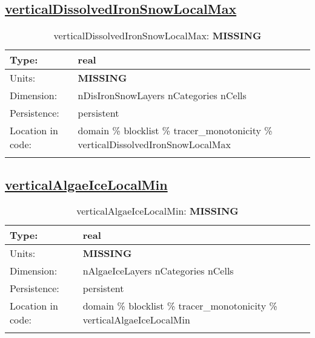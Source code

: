 \subsection[verticalDissolvedIronSnowLocalMax]{\hyperref[sec:var_tab_tracer_monotonicity]{verticalDissolvedIronSnowLocalMax}}
\label{subsec:var_sec_tracer_monotonicity_verticalDissolvedIronSnowLocalMax}
\begin{center}
\begin{longtable}{| p{2.0in} | p{4.0in} |}
        \hline 
        Type: & real \\
        \hline 
        Units: & {\bf \color{red} MISSING} \\
        \hline 
        Dimension: & nDisIronSnowLayers nCategories nCells \\
        \hline 
        Persistence: & persistent \\
        \hline 
         Location in code: & domain \% blocklist \% tracer\_monotonicity \% verticalDissolvedIronSnowLocalMax \\
         \hline 
    \caption{verticalDissolvedIronSnowLocalMax: {\bf \color{red} MISSING}}
\end{longtable}
\end{center}
\subsection[verticalAlgaeIceLocalMin]{\hyperref[sec:var_tab_tracer_monotonicity]{verticalAlgaeIceLocalMin}}
\label{subsec:var_sec_tracer_monotonicity_verticalAlgaeIceLocalMin}
\begin{center}
\begin{longtable}{| p{2.0in} | p{4.0in} |}
        \hline 
        Type: & real \\
        \hline 
        Units: & {\bf \color{red} MISSING} \\
        \hline 
        Dimension: & nAlgaeIceLayers nCategories nCells \\
        \hline 
        Persistence: & persistent \\
        \hline 
         Location in code: & domain \% blocklist \% tracer\_monotonicity \% verticalAlgaeIceLocalMin \\
         \hline 
    \caption{verticalAlgaeIceLocalMin: {\bf \color{red} MISSING}}
\end{longtable}
\end{center}
